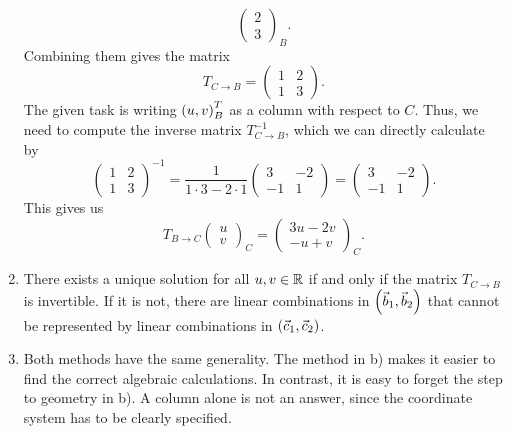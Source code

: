 \documentclass[english]{exercise}
\begin{document}
\begin{enumerate}
\[\begin{pmatrix}
				2\\
				3
			\end{pmatrix}_B.
		\]
		Combining them gives the matrix
		\[
			T_{C \to B} = \begin{pmatrix}
				1 & 2\\
				1 & 3
			\end{pmatrix}.
		\]
		The given task is writing \(\parentheses*{u, v}_B^T\) as a column with respect to \(C\).
		Thus, we need to compute the inverse matrix \(T_{C \to B}^{-1}\), which we can directly calculate by
		\[
			\begin{pmatrix}
				1 & 2\\
				1 & 3
			\end{pmatrix}^{-1} = \frac{1}{1 \cdot 3 - 2 \cdot 1}\begin{pmatrix}
				3 & -2\\
				-1 & 1
			\end{pmatrix} = \begin{pmatrix}
				3 & -2\\
				-1 & 1
			\end{pmatrix}.
		\]
		This gives us
		\[
			T_{B \to C}\begin{pmatrix}
				u\\
				v
			\end{pmatrix}_C = \begin{pmatrix}
				3u - 2v\\
				-u + v
			\end{pmatrix}_C.
		\]
		\item There exists a unique solution for all \(u, v \in \R\) if and only if the matrix \(T_{C \to B}\) is invertible.
		If it is not, there are linear combinations in \(\parentheses*{\vec{b}_1, \vec{b}_2}\) that cannot be represented by linear combinations in \(\parentheses*{\vec{c}_1, \vec{c}_2}\).
		\item Both methods have the same generality.
		The method in b) makes it easier to find the correct algebraic calculations.
		In contrast, it is easy to forget the step to geometry in b).
		A column alone is not an answer, since the coordinate system has to be clearly specified.
	\end{enumerate}


	\section{}
\end{document}
